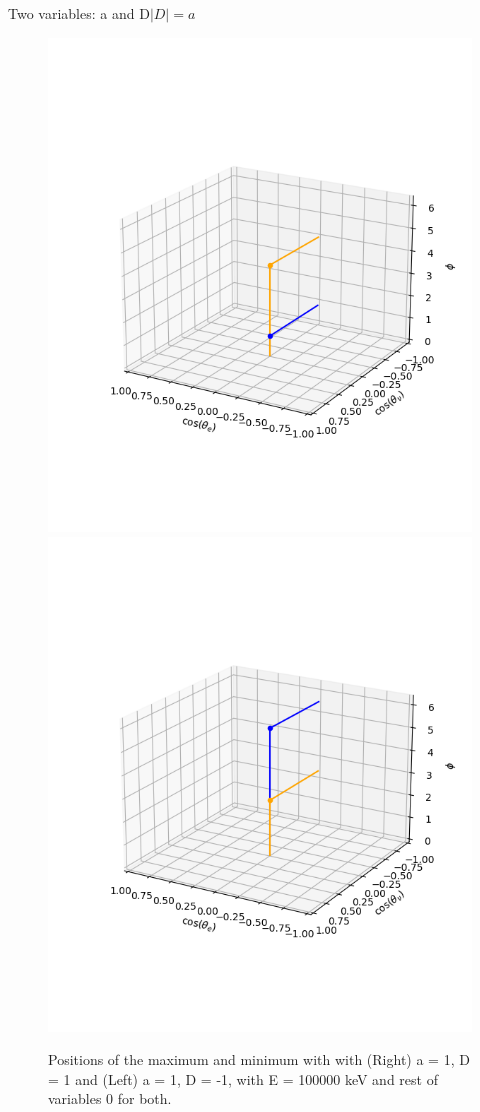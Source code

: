 \documentclass{beamer}
\begin{document}
\begin{frame}{Two variables: a and D}{$|D|= a$}
	\begin{figure}
		\centering
		\includegraphics[width=0.4\paperwidth]{plots/posa_eqposD_max_min}
		\includegraphics[width=0.4\paperwidth]{plots/posa_eqnegD_max_min}
		\caption{Positions of the maximum and minimum with with (Right) a = 1, D = 1 and (Left) a = 1, D = -1, with E = 100000 keV and rest of variables 0 for both.}
	\end{figure}
\end{frame}
\end{document}
